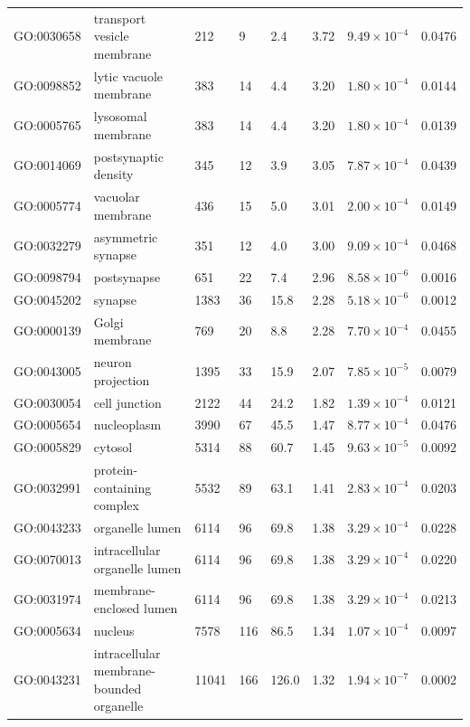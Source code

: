 \begin{table}[ht]
\begin{adjustbox}{width=\textwidth}
\begin{tabular}{llllllll}
  GO:0030658 & transport vesicle membrane  & 212 & 9 & 2.4 & 3.72 & $9.49 \times 10^{-4}$ & 0.0476 \\ 
  GO:0098852 & lytic vacuole membrane  & 383 & 14 & 4.4 & 3.20 & $1.80 \times 10^{-4}$ & 0.0144 \\ 
  GO:0005765 & lysosomal membrane  & 383 & 14 & 4.4 & 3.20 & $1.80 \times 10^{-4}$ & 0.0139 \\ 
  GO:0014069 & postsynaptic density  & 345 & 12 & 3.9 & 3.05 & $7.87 \times 10^{-4}$ & 0.0439 \\ 
  GO:0005774 & vacuolar membrane  & 436 & 15 & 5.0 & 3.01 & $2.00 \times 10^{-4}$ & 0.0149 \\ 
  GO:0032279 & asymmetric synapse  & 351 & 12 & 4.0 & 3.00 & $9.09 \times 10^{-4}$ & 0.0468 \\ 
  GO:0098794 & postsynapse  & 651 & 22 & 7.4 & 2.96 & $8.58 \times 10^{-6}$ & 0.0016 \\ 
  GO:0045202 & synapse  & 1383 & 36 & 15.8 & 2.28 & $5.18 \times 10^{-6}$ & 0.0012 \\ 
  GO:0000139 & Golgi membrane  & 769 & 20 & 8.8 & 2.28 & $7.70 \times 10^{-4}$ & 0.0455 \\ 
  GO:0043005 & neuron projection  & 1395 & 33 & 15.9 & 2.07 & $7.85 \times 10^{-5}$ & 0.0079 \\ 
  GO:0030054 & cell junction  & 2122 & 44 & 24.2 & 1.82 & $1.39 \times 10^{-4}$ & 0.0121 \\ 
  GO:0005654 & nucleoplasm  & 3990 & 67 & 45.5 & 1.47 & $8.77 \times 10^{-4}$ & 0.0476 \\ 
  GO:0005829 & cytosol  & 5314 & 88 & 60.7 & 1.45 & $9.63 \times 10^{-5}$ & 0.0092 \\ 
  GO:0032991 & protein-containing complex  & 5532 & 89 & 63.1 & 1.41 & $2.83 \times 10^{-4}$ & 0.0203 \\ 
  GO:0043233 & organelle lumen  & 6114 & 96 & 69.8 & 1.38 & $3.29 \times 10^{-4}$ & 0.0228 \\ 
  GO:0070013 & intracellular organelle lumen  & 6114 & 96 & 69.8 & 1.38 & $3.29 \times 10^{-4}$ & 0.0220 \\ 
  GO:0031974 & membrane-enclosed lumen  & 6114 & 96 & 69.8 & 1.38 & $3.29 \times 10^{-4}$ & 0.0213 \\ 
  GO:0005634 & nucleus  & 7578 & 116 & 86.5 & 1.34 & $1.07 \times 10^{-4}$ & 0.0097 \\ 
  GO:0043231 & intracellular membrane-bounded organelle  & 11041 & 166 & 126.0 & 1.32 & $1.94 \times 10^{-7}$ & 0.0002 \\ 

\end{tabular}
\end{adjustbox}
\end{table}
